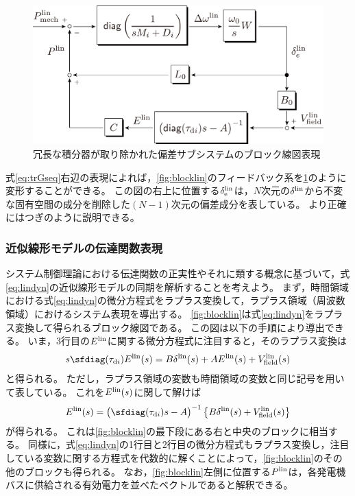 \documentclass[tombow,dvipdfmx]{corona-a5}
\begin{document}
\begin{figure}[t]
\centering
\includegraphics[width = .75\linewidth]{figs/blocklinsysnew}
\caption{冗長な積分器が取り除かれた偏差サブシステムのブロック線図表現}
\label{fig:blocklinnew}
\end{figure}

式\ref{eq:trGseq}右辺の表現によれば，\ref{fig:blocklin}のフィードバック系を\ref{fig:blocklinnew}のように変形することができる。
この図の右上に位置する$\delta^{\rm lin}_{\rm e}$は，$N$次元の$\delta^{\rm lin}$から不変な固有空間の成分を削除した$(N-1)$次元の偏差成分を表している。
より正確にはつぎのように説明できる。






\subsubsection{近似線形モデルの伝達関数表現}

システム制御理論における伝達関数の正実性やそれに類する概念に基づいて，式\ref{eq:lindyn}の近似線形モデルの同期を解析することを考えよう。
まず，時間領域における式\ref{eq:lindyn}の微分方程式をラプラス変換して，ラプラス領域（周波数領域）におけるシステム表現を導出する。
\ref{fig:blocklin}は式\ref{eq:lindyn}をラプラス変換して得られるブロック線図である。
この図は以下の手順により導出できる。
いま，3行目の$E^{\rm lin}$に関する微分方程式に注目すると，そのラプラス変換は
\begin{align*}
s \sfdiag(\tau_{{\rm d}i}) E^{\rm lin}(s)
= B \delta^{\rm lin}(s) + A E^{\rm lin}(s) + V^{\rm lin}_{\rm field}(s)
\end{align*}
と得られる。
ただし，ラプラス領域の変数も時間領域の変数と同じ記号を用いて表している。
これを$E^{\rm lin}(s)$に関して解けば
\begin{align*}
E^{\rm lin}(s) = \bigl( \sfdiag(\tau_{{\rm d}i})s -A \bigr)^{-1} 
\left\{ B \delta^{\rm lin}(s)
+ V^{\rm lin}_{\rm field}(s) \right\}
\end{align*}
が得られる。
これは\ref{fig:blocklin}の最下段にある右と中央のブロックに相当する。
同様に，式\ref{eq:lindyn}の1行目と2行目の微分方程式もラプラス変換し，注目している変数に関する方程式を代数的に解くことによって，\ref{fig:blocklin}のその他のブロックも得られる。
なお，\ref{fig:blocklin}左側に位置する$P^{\rm lin}$は，各発電機バスに供給される有効電力を並べたベクトルであると解釈できる。
\end{document}
